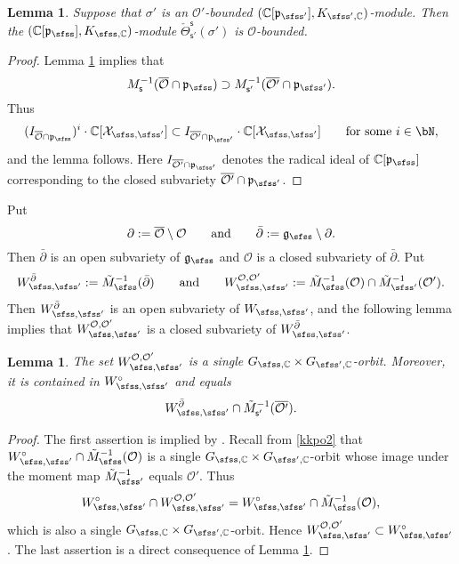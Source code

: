 \documentclass[12pt,a4paper]{amsart}
\newcommand{\CO}{{\mathcal {O}}}
\newcommand{\CX}{{\mathcal {X}}}
\newcommand{\g}{\mathfrak g}
\newcommand{\p}{\mathfrak p}
\numberwithin{equation}{section}
\newtheorem{lem}[thm]{Lemma}
\theoremstyle{remark}
\begin{document}
\begin{lem}\label{comobound}
Suppose that $\sigma'$ is an $\CO'$-bounded $(\C[\p_{\sfss'}], K_{\sfss', \C})$-module.  Then the  $(\C[\p_{\sfss}], K_{\sfss, \C})$-module   $\check \Theta_{\mathsf s'}^{\mathsf s}(\sigma')$ is $\CO$-bounded. 
\end{lem}
\begin{proof}
Lemma \ref{liftop0} implies that
\[
   M_{\mathsf s}^{-1}(\overline{\CO}\cap \p_\sfss)\supset M_{\mathsf s'}^{-1}(\overline{\CO'}\cap \p_{\sfss'}). 
\]
Thus
\[
 ( I_{\overline{\CO}\cap \p_\sfss})^i\cdot \C[\CX_{\sfss, \sfss'}] \subset I_{\overline{\CO'}\cap \p_{\sfss'}}\cdot  \C[\CX_{\sfss, \sfss'}]\qquad \textrm{for some } i\in \bN, 
\]
and the lemma follows. Here $I_{\overline{\CO'}\cap \p_{\sfss'}}$ denotes  the radical ideal of $\C[\p_\sfss]$ corresponding to the closed subvariety $\overline{\CO'}\cap \p_{\sfss'}$. 
\end{proof}


Put 
\[
\partial :=\overline \CO\setminus \CO\qquad\textrm{and}\qquad  \bar \partial :=\g_\sfss\setminus \partial.
\]
Then $\bar \partial$ is an open subvariety of $\g_\sfss$ and $\CO$ is a closed subvariety of $\bar \partial$. 
Put 
\[
W_{\sfss, \sfss'}^{\bar \partial}:=\tilde M_{\sfss}^{-1}(\bar \partial )
\qquad\textrm{and}\qquad
  W_{\sfss, \sfss'}^{\CO, \CO'}:=\tilde M_{\sfss}^{-1}(\CO)\cap  \tilde M_{\sfss'}^{-1}(\CO').
\]
Then $W_{\sfss, \sfss'}^{\bar \partial}$ is an open subvariety of $W_{\sfss, \sfss'}$, and the following lemma implies that $W_{\sfss, \sfss'}^{\CO, \CO'}$ is a closed subvariety of $W_{\sfss, \sfss'}^{\bar \partial}$.

\begin{lem}\label{liftop0}
The set $W_{\sfss, \sfss'}^{\CO, \CO'}$ is  a single $G_{\sfss, \C}\times G_{\sfss',\C}$-orbit. Moreover, it is  contained in $W_{\sfss,\sfss'}^\circ$ and equals 
\[
   W_{\sfss, \sfss'}^{\bar \partial} \cap \tilde M_{\mathsf s'}^{-1}(\overline{\CO'}).
\]
\end{lem}
\begin{proof}
The first assertion is implied by \cite[Theorem 3.6]{DKPC}. Recall from \eqref{kkpo2} that $W_{\sfss,\sfss'}^\circ\cap \tilde M_{\sfss}^{-1}(\CO)$ is a single  $G_{\sfss, \C}\times G_{\sfss',\C}$-orbit  whose image under the moment map $\tilde M_{\sfss'}^{-1}$ equals $\CO'$. Thus 
\[
W_{\sfss,\sfss'}^\circ\cap W_{\sfss, \sfss'}^{\CO, \CO'}=W_{\sfss,\sfss'}^\circ\cap \tilde M_{\sfss}^{-1}(\CO),
\]
which  is also a   single  $G_{\sfss, \C}\times G_{\sfss',\C}$-orbit. Hence $W_{\sfss, \sfss'}^{\CO, \CO'}\subset W_{\sfss,\sfss'}^\circ$. The last assertion is a direct consequence of Lemma \ref{liftop0}. 

\end{proof}
\end{document}

